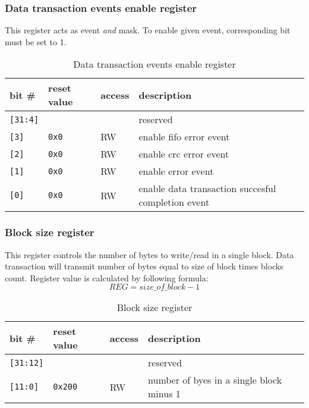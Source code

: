     \subsubsection{Data transaction events enable register}
    \label{sec:data_ena_reg}
    
    This register acts as event \textit{and} mask. To enable given event, corresponding bit must be set to 1.
    
    \begin{table}[H]
    \caption{Data transaction events enable register}
        \begin{tabular}{m{1.3cm}|m{2cm}|m{1cm}|m{8cm}}
                \rowcolor[gray]{0.7} bit \# & reset value & access & description \\ \hline \hline
                \texttt{[31:4]} & & & reserved \\ \hline
                \texttt{[3]} & \texttt{0x0} & RW & enable fifo error event \\ \hline
                \texttt{[2]} & \texttt{0x0} & RW & enable crc error event \\ \hline
                \texttt{[1]} & \texttt{0x0} & RW & enable error event \\ \hline
                \texttt{[0]} & \texttt{0x0} & RW & enable data transaction succesful completion event \\ \hline
                \hline
        \end{tabular}
        \label{tab:data_ena_reg}
    \end{table}
    
    \subsubsection{Block size register}
    \label{sec:blocksize_reg}
    
    This register controls the number of bytes to write/read in a single block. Data transaction will transmit number of bytes equal to size of block times blocks count.
    Register value is calculated by following formula:
    \begin{equation}
    REG = size\_of\_block - 1
    \end{equation} 
        
    \begin{table}[H]
    \caption{Block size register}
        \begin{tabular}{m{1.3cm}|m{2cm}|m{1cm}|m{8cm}}
                \rowcolor[gray]{0.7} bit \# & reset value & access & description \\ \hline \hline
                \texttt{[31:12]} & & & reserved \\ \hline
                \texttt{[11:0]} & \texttt{0x200} & RW & number of byes in a single block minus 1\\ \hline
                \hline
        \end{tabular}
        \label{tab:blocksize_reg}
    \end{table}
    
